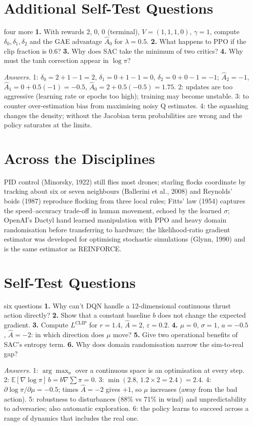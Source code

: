 \documentclass[11pt]{article}
\begin{document}
\section{Additional Self-Test Questions}
\begin{question}{four more}
\textbf{1.} With rewards 2, 0, 0 (terminal), $V=(1,1,1,0)$, $\gamma=1$, compute $\delta_0,\delta_1,\delta_2$ and the GAE advantage $\hat A_0$ for $\lambda=0.5$. \textbf{2.} What happens to PPO if the clip fraction is 0.6? \textbf{3.} Why does SAC take the minimum of two critics? \textbf{4.} Why must the tanh correction appear in $\log\pi$?

\textit{Answers.} 1: $\delta_0=2+1-1=2$, $\delta_1=0+1-1=0$, $\delta_2=0+0-1=-1$; $\hat A_2=-1$, $\hat A_1=0+0.5(-1)=-0.5$, $\hat A_0=2+0.5(-0.5)=1.75$. 2: updates are too aggressive (learning rate or epochs too high); training may become unstable. 3: to counter over-estimation bias from maximising noisy Q estimates. 4: the squashing changes the density; without the Jacobian term probabilities are wrong and the policy saturates at the limits.
\end{question}

\section{Across the Disciplines}
PID control (Minorsky, 1922) still flies most drones; starling flocks coordinate by tracking about six or seven neighbours (Ballerini et al., 2008) and Reynolds' boids (1987) reproduce flocking from three local rules; Fitts' law (1954) captures the speed--accuracy trade-off in human movement, echoed by the learned $\sigma$; OpenAI's Dactyl hand learned manipulation with PPO and heavy domain randomisation before transferring to hardware; the likelihood-ratio gradient estimator was developed for optimising stochastic simulations (Glynn, 1990) and is the same estimator as REINFORCE.

\section{Self-Test Questions}
\begin{question}{six questions}
\textbf{1.} Why can't DQN handle a 12-dimensional continuous thrust action directly? \textbf{2.} Show that a constant baseline $b$ does not change the expected gradient. \textbf{3.} Compute $L^{\text{CLIP}}$ for $r=1.4$, $\hat A=2$, $\varepsilon=0.2$. \textbf{4.} $\mu=0$, $\sigma=1$, $a=-0.5$, $\hat A=-2$: in which direction does $\mu$ move? \textbf{5.} Give two operational benefits of SAC's entropy term. \textbf{6.} Why does domain randomisation narrow the sim-to-real gap?

\textit{Answers.} 1: $\arg\max_a$ over a continuous space is an optimisation at every step. 2: $\mathbb E[\nabla\log\pi]\,b=b\nabla\sum\pi=0$. 3: $\min(2.8,\,1.2\times2=2.4)=2.4$. 4: $\partial\log\pi/\partial\mu=-0.5$; times $\hat A=-2$ gives $+1$, so $\mu$ increases (away from the bad action). 5: robustness to disturbances (88\% vs 71\% in wind) and unpredictability to adversaries; also automatic exploration. 6: the policy learns to succeed across a range of dynamics that includes the real one.
\end{question}
\end{document}
